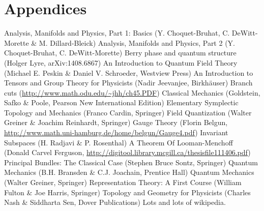 \documentclass[12pt]{report}
\begin{document}
\part{Appendices}
\begin{appendices}



\end{appendices}

\nomenclature[S]{$]a, b[$}{Open interval}
\printnomenclature

\begin{thebibliography}{99}
	Analysis, Manifolds and Physics, Part 1: Basics (Y. Choquet-Bruhat, C. DeWitt-Morette \& M. Dillard-Bleick)
	Analysis, Manifolds and Physics, Part 2 (Y. Choquet-Bruhat, C. DeWitt-Morette)
	Berry phase and quantum structure (Holger Lyre, arXiv:1408.6867)
	An Introduction to Quantum Field Theory (Michael E. Peskin \& Daniel V. Schroeder, Westview Press)
    	An Introduction to Tensors and Group Theory for Physicists (Nadir Jeevanjee, Birkh\"auser)
    	Branch cuts (\url{http://www.math.odu.edu/~jhh/ch45.PDF})
	Classical Mechanics (Goldstein, Safko \& Poole, Pearson New International Edition)
	Elementary Symplectic Topology and Mechanics (Franco Cardin, Springer)
	Field Quantization (Walter Greiner \& Joachim Reinhardt, Springer)
	Gauge Theory (Florin Belgun, \url{http://www.math.uni-hamburg.de/home/belgun/Gauge4.pdf})
	Invariant Subspaces (H. Radjavi \& P. Rosenthal)
	A Theorem Of Looman-Menchoff (Donald Carvel Ferguson, \url{http://digitool.library.mcgill.ca/thesisfile111406.pdf})
	Principal Bundles: The Classical Case (Stephen Bruce Sontz, Springer)
    	Quantum Mechanics (B.H. Bransden \& C.J. Joachain, Prentice Hall)
    	Quantum Mechanics (Walter Greiner, Springer)
	Representation Theory: A First Course (William Fulton \& Joe Harris, Springer)
	Topology and Geometry for Physicists (Charles Nash \& Siddharta Sen, Dover Publications)
	Lots and lots of wikipedia.
\end{thebibliography}
\printindex
\end{document}
